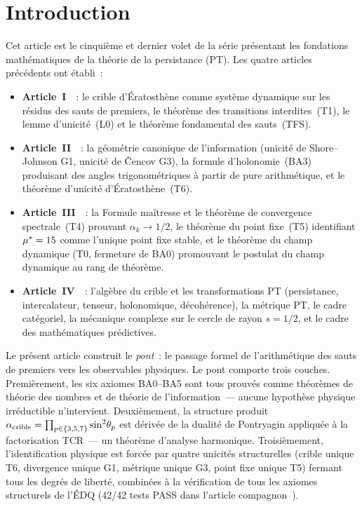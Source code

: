 \documentclass[12pt,a4paper]{article}
\begin{document}
\tableofcontents
\newpage

\section{Introduction}
\label{sec:intro}

Cet article est le cinquième et dernier volet de la série présentant
les fondations mathématiques de la théorie de la persistance (PT).
Les quatre articles précédents ont établi~:

\begin{itemize}[nosep]
\item \textbf{Article~I}~\cite{companion_M1}~: le crible
  d'Ératosthène comme système dynamique sur les résidus des sauts de
  premiers, le théorème des transitions interdites~(T1), le lemme
  d'unicité~(L0) et le théorème fondamental des sauts~(TFS).
\item \textbf{Article~II}~\cite{companion_M2}~: la géométrie
  canonique de l'information (unicité de Shore--Johnson G1, unicité
  de \v{C}encov G3), la formule d'holonomie~(BA3) produisant des
  angles trigonométriques à partir de pure arithmétique, et le
  théorème d'unicité d'Ératosthène~(T6).
\item \textbf{Article~III}~\cite{companion_M3}~: la Formule maîtresse
  et le théorème de convergence spectrale~(T4) prouvant
  $\alpha_k \to 1/2$, le théorème du point fixe~(T5) identifiant
  ${\mu^{*}} = 15$ comme l'unique point fixe stable, et le théorème
  du champ dynamique (T0, fermeture de BA0) promouvant le postulat
  du champ dynamique au rang de théorème.
\item \textbf{Article~IV}~\cite{companion_M4}~: l'algèbre du crible
  et les transformations PT (persistance, intercalateur, tenseur,
  holonomique, décohérence), la métrique PT, le cadre catégoriel,
  la mécanique complexe sur le cercle de rayon $s = 1/2$, et le
  cadre des mathématiques prédictives.
\end{itemize}

Le présent article construit le \emph{pont}~: le passage formel
de l'arithmétique des sauts de premiers vers les observables
physiques. Le pont comporte trois couches. Premièrement, les six
axiomes BA0--BA5 sont tous prouvés comme théorèmes de théorie
des nombres et de théorie de l'information~--- aucune hypothèse
physique irréductible n'intervient. Deuxièmement, la structure
produit
$\alpha_{\rm crible} = \prod_{p \in \{3,5,7\}} \sin^2\!\theta_p$
est dérivée de la dualité de Pontryagin appliquée à la
factorisation TCR~--- un théorème d'analyse harmonique.
Troisièmement, l'identification physique est forcée par quatre
unicités structurelles (crible unique T6, divergence unique G1,
métrique unique G3, point fixe unique T5) fermant tous les degrés
de liberté, combinées à la vérification de tous les axiomes
structurels de l'ÉDQ (42/42 tests PASS dans l'article
compagnon~\cite{companion_physics}).
\end{document}
